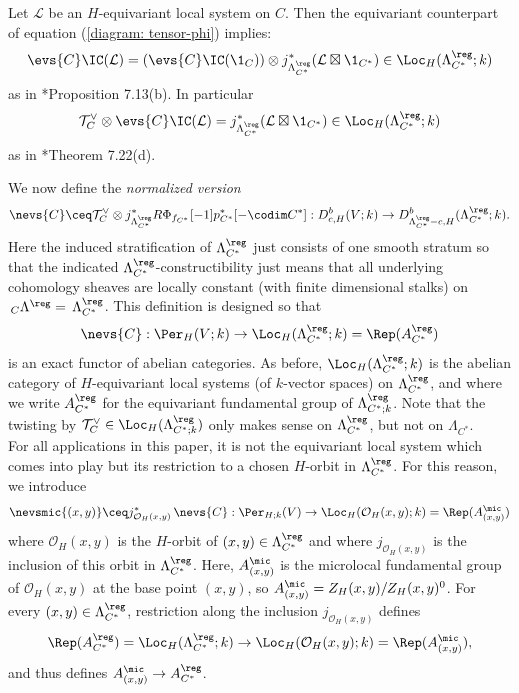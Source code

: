 \documentclass[11pt,letterpaper]{amsart}
\numberwithin{equation}{section}
\begin{document}
\begin{remark}\label{local-sys}
 Let $\mathcal{L}$ be an $H$-equivariant local system on $C$. Then the equivariant counterpart of equation (\ref{diagram: tensor-phi}) implies:
\begin{equation}\label{twisting1}
 \evs{C}\IC(\mathcal{L}) =(\evs{C}\IC(\1_{C}))\otimes j^*_{\Lambda_{C^*}^\reg}(\mathcal{L}\boxtimes \1_{C^*})
 \in \Loc_{H}(\Lambda_{C^*}^\reg;k)
\end{equation}
 as in \cite{CFMMX22}*{Proposition 7.13(b)}.
 In particular
 \begin{equation}\label{twisting2}
 \mathcal{T}_{C}^\vee \otimes \evs{C}\IC(\mathcal{L}) = j^*_{\Lambda_{C^*}^\reg}(\mathcal{L}\boxtimes \1_{C^*})
 \in \Loc_{H}(\Lambda_{C^*}^\reg;k)
 \end{equation}
 as in \cite{CFMMX22}*{Theorem 7.22(d)}.
\end{remark}
We now  define the {\it normalized version}
\begin{equation}\label{equation: appendix NEvs}
\nevs{C} \ceq 
\mathcal{T}_{C}^\vee \otimes j^*_{\Lambda^\reg_{C^*}} R\Phi_{f_{C^*}}[-1]p_{C^*}^*[-\codim C^*] :  D^b_{c,H}(V;k) \to D^b_{\Lambda^\reg_{C^*}-c,H}(\Lambda^\reg_{C^*};k).
\end{equation}
Here the induced stratification of $\Lambda^\reg_{C^*}$ just consists of one smooth stratum so that the indicated 
$\Lambda^\reg_{C^*}$-constructibility just means that all underlying cohomology sheaves are locally constant (with finite dimensional stalks) on $\,_{C}\Lambda^\reg = \,\Lambda^\reg_{C^*}$.
This definition is designed so that
\[
\nevs{C} : \Per_{H}(V;k) \to \Loc_{H}(\Lambda^\reg_{C^*};k) = \Rep(A^\reg_{C^*})
\]
is an exact functor of abelian categories.
As before, $\Loc_{H}(\Lambda^\reg_{C^*};k)$ is the abelian category of $H$-equivariant local systems (of $k$-vector spaces) on $\Lambda^\reg_{C^*}$, and where we write $A^\reg_{C^*}$ for the equivariant fundamental group of $\Lambda^\reg_{C^*;k}$.
Note that the twisting by $\mathcal{T}_{C}^\vee \in \Loc_{H}(\Lambda^\reg_{C^*;k})$ only makes sense on $\Lambda^\reg_{C^*}$, but not on $\Lambda_{C^*}$.\\

For all applications in this paper, it is not the equivariant local system which comes into play but its restriction to a chosen $H$-orbit in $\Lambda_{C^*}^\reg$. For this reason, we introduce
\begin{equation}\label{nevs-mic}
\nevsmic{(x,y)} \ceq j^*_{\mathcal{O}_{H}(x,y)}\, \nevs{C}: \Per_{H;k}(V) \to \Loc_{H}(\mathcal{O}_{H}(x,y);k) = \Rep(A^\mic_{(x,y)})
\end{equation}
where $\mathcal{O}_H(x,y)$ is the $H$-orbit of $(x,y)\in \Lambda_{C^*}^\reg$ and where $j_{\mathcal{O}_{H}(x,y)}$ is the inclusion of this orbit in $\Lambda_{C^*}^\reg$.
Here, $A^\mic_{(x,y)}$ is the microlocal fundamental group of $\mathcal{O}_{H}(x,y)$ at the base point $(x,y)$, so $A^\mic_{(x,y)} = Z_{H}(x,y)/Z_{H}(x,y)^0$.
For every $(x,y)\in \Lambda_{C^*}^\reg$,  restriction along the inclusion $j_{\mathcal{O}_{H}(x,y)}$
defines 
\[
\Rep(A_{C^*}^\reg) = \Loc_{H}(\Lambda^\reg_{C^*};k) \to \Loc_{H}(\mathcal{O}_H(x,y);k) = \Rep(A^\mic_{(x,y)}),
\]
and thus defines $A^\mic_{(x,y)} \to A^\reg_{C^*}$.\\
\end{document}
